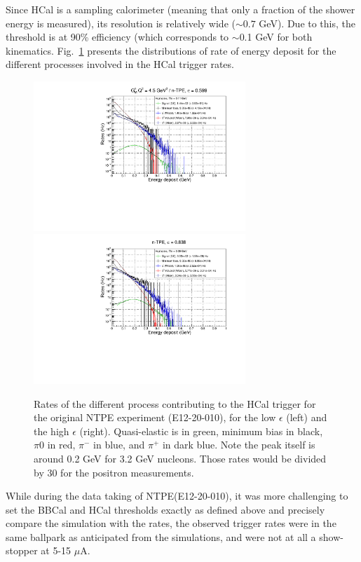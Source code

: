 Since HCal is a sampling calorimeter (meaning that only a fraction of the shower energy is measured), its resolution is relatively wide ($\sim0.7$ GeV).
Due to this, the threshold is at 90\% efficiency (which corresponds to $\sim$0.1 GeV for both kinematics.
Fig.~\ref{fig:HCalRates} presents the distributions of rate of energy deposit for the different processes involved in the HCal trigger rates.
\begin{figure}[h]
  \centering
    \includegraphics[width=8cm]{Plots/HCalRates_gen-tpe_le.pdf}
    \includegraphics[width=8cm]{Plots/HCalRates_gen-tpe_he.pdf}
    \caption{Rates of the different process contributing to the HCal trigger for the original NTPE experiment (E12-20-010), for the low $\epsilon$ (left) and the high $\epsilon$ (right). Quasi-elastic is in green, minimum bias in black, $\pi0$ in red, $\pi^-$ in blue, and $\pi^+$ in dark blue. Note the peak itself is around 0.2 GeV for 3.2 GeV nucleons. Those rates would be divided by 30 for the positron measurements.}
    \label{fig:HCalRates}
\end{figure}
%

While during the data taking of NTPE(E12-20-010), it was more challenging to set the BBCal and HCal thresholds exactly as defined above and precisely compare the simulation with the rates, the observed trigger rates were in the same ballpark as anticipated from the simulations, and were not at all a show-stopper at 5-15 $\mu$A.



